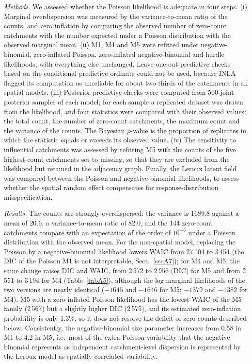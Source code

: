 \documentclass[journal abbreviation, manuscript]{copernicus}
\begin{document}
\textit{Methods.} We assessed whether the Poisson likelihood is adequate in four steps. (i) Marginal overdispersion was measured by the variance-to-mean ratio of the counts, and zero inflation by comparing the observed number of zero-count catchments with the number expected under a Poisson distribution with the observed marginal mean. (ii) M1, M4 and M5 were refitted under negative-binomial, zero-inflated Poisson, zero-inflated negative-binomial and hurdle likelihoods, with everything else unchanged. Leave-one-out predictive checks based on the conditional predictive ordinate could not be used, because INLA flagged its computation as unreliable for about two thirds of the catchments in all spatial models. (iii) Posterior predictive checks were computed from 500 joint posterior samples of each model; for each sample a replicated dataset was drawn from the likelihood, and four statistics were compared with their observed values: the total count, the number of zero-count catchments, the maximum count and the variance of the counts. The Bayesian $p$-value is the proportion of replicates in which the statistic equals or exceeds its observed value. (iv) The sensitivity to influential catchments was assessed by refitting M5 with the counts of the five highest-count catchments set to missing, so that they are excluded from the likelihood but retained in the adjacency graph. Finally, the Leroux latent field was compared between the Poisson and negative-binomial likelihoods, to assess whether the spatial random effect compensates for response-distribution misspecification.

\textit{Results.} The counts are strongly overdispersed: the variance is 1689.8 against a mean of 20.6, a variance-to-mean ratio of 82.0, and the 144 zero-count catchments compare with an expectation of the order of $10^{-6}$ under a Poisson distribution with the observed mean. For the non-spatial model, replacing the Poisson by a negative-binomial likelihood lowers WAIC from 27\,104 to 3\,454 (the DIC of the Poisson M1 is not interpretable, Sect.~\ref{secA7}); for M4 and M5, the same change raises DIC and WAIC, from 2\,572 to 2\,956 (DIC) for M5 and from 2\,551 to 3\,194 for M4 (Table~\ref{tabA5}), although the log marginal likelihoods of the two versions are nearly identical ($-1645$ and $-1646$ for M5; $-1379$ and $-1382$ for M4). M5 with a zero-inflated Poisson likelihood has the lowest WAIC of the M5 family (2\,567) but a slightly higher DIC (2\,575), and its estimated zero-inflation probability is only 1.3\%, so it does not resolve the deficit of zero counts described below. Consistently, the negative-binomial size parameter increases from 0.58 in M1 to 4.2 in M5, i.e.\ most of the extra-Poisson variability that the negative binomial represents as independent catchment-level dispersion is represented by the Leroux model as spatially correlated variability.
\end{document}
